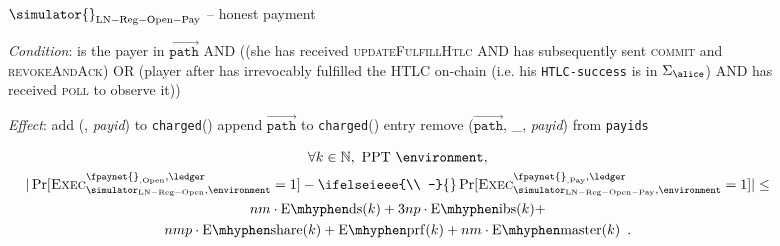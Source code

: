\begin{figure}[H]
  \begin{simulatorbox}{$\simulator{}_{\mathrm{LN - Reg - Open - Pay}}$ -- honest
  payment}
    \begin{algorithmic}[1]
      \Statex \textit{Condition}:
      \Indent
        \State \alice{} is the payer in $\overrightarrow{\mathtt{path}}$ AND
        ((she has received \textsc{updateFulfillHtlc} AND has subsequently sent
        \textsc{commit} and \textsc{revokeAndAck}) OR (player after
        \alice{} has irrevocably fulfilled the HTLC on-chain (i.e. his
        \texttt{HTLC-success} is in $\Sigma_{\alice}$) AND \alice{} has
        received \textsc{poll} to observe it))
        \label{alg:sim:resolvepay:honest:cond}
      \EndIndent
      \Statex

      \Statex \textit{Effect}:
      \Indent
        \State add (\alice, \textit{payid}) to \texttt{charged}(\alice)
          \State append $\overrightarrow{\mathtt{path}}$ to
          \texttt{charged}(\alice) entry
        \EndIf
        \State remove ($\overrightarrow{\mathtt{path}}$, \_,
        \textit{payid}) from \texttt{payids}
      \EndIndent
    \end{algorithmic}
  \end{simulatorbox}
  \caption{}
  \label{alg:sim:resolvepay:honest:fig}
\end{figure}

\begin{lemma}
  \label{lemma:pay}
  \begin{gather*}
    \forall k \in \mathbb{N}, \text{ PPT } \environment, \\
    |\Pr[\textsc{Exec}^{\fpaynet{}_{\mathrm{, Open}},
    \ledger}_{\simulator_{\mathrm{LN - Reg - Open}}, \environment} = 1] -
    \ifelseieee{\\ -}{}
    \Pr[\textsc{Exec}^{\fpaynet{}_{\mathrm{, Pay}},
    \ledger}_{\simulator_{\mathrm{LN - Reg - Open - Pay}}, \environment} = 1]|
    \leq \\
    nm \cdot \mathrm{E \mhyphen ds}(k) + 3np \cdot \mathrm{E \mhyphen ibs}(k) +
    \\
    nmp \cdot \mathrm{E \mhyphen share}(k) + \mathrm{E \mhyphen prf}(k) + nm
    \cdot \mathrm{E \mhyphen master}(k) \enspace.
  \end{gather*}
\end{lemma}


